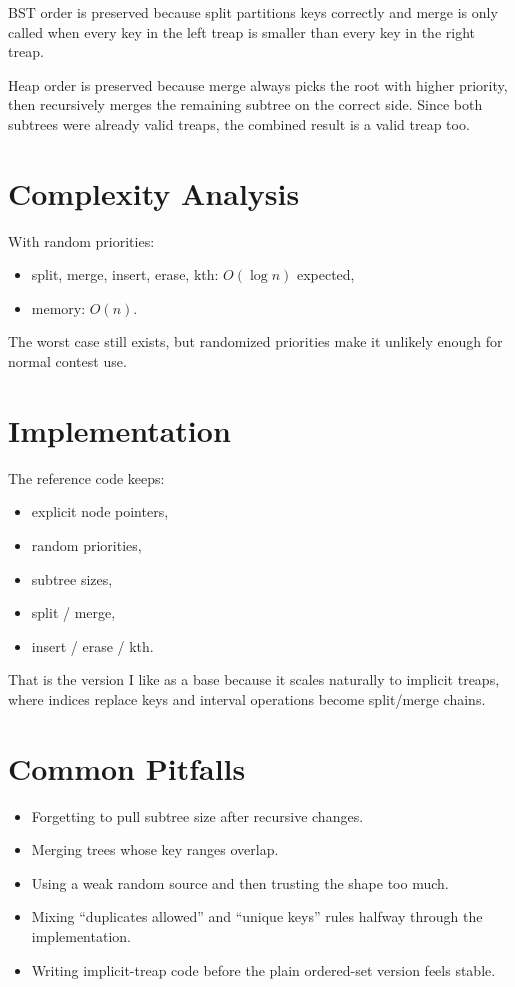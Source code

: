 BST order is preserved because split partitions keys correctly and merge is only called when every key in the left
treap is smaller than every key in the right treap.

Heap order is preserved because merge always picks the root with higher priority, then recursively merges the remaining
subtree on the correct side. Since both subtrees were already valid treaps, the combined result is a valid treap too.

\section*{Complexity Analysis}

With random priorities:

\begin{itemize}
  \item split, merge, insert, erase, kth: \(O(\log n)\) expected,
  \item memory: \(O(n)\).
\end{itemize}

The worst case still exists, but randomized priorities make it unlikely enough for normal contest use.

\section*{Implementation}

The reference code keeps:

\begin{itemize}
  \item explicit node pointers,
  \item random priorities,
  \item subtree sizes,
  \item split / merge,
  \item insert / erase / kth.
\end{itemize}

That is the version I like as a base because it scales naturally to implicit treaps, where indices replace keys and
interval operations become split/merge chains.

\section*{Common Pitfalls}

\begin{itemize}
  \item Forgetting to pull subtree size after recursive changes.
  \item Merging trees whose key ranges overlap.
  \item Using a weak random source and then trusting the shape too much.
  \item Mixing ``duplicates allowed'' and ``unique keys'' rules halfway through the implementation.
  \item Writing implicit-treap code before the plain ordered-set version feels stable.
\end{itemize}

